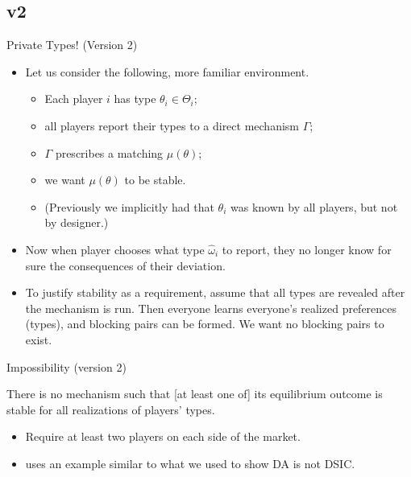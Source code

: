\documentclass[english,10pt
,aspectratio=169
]{beamer}
\begin{document}
\subsection{v2}

\begin{frame}{Private Types! (Version 2)}
\begin{itemize}
	\item Let us consider the following, more familiar environment.
	\begin{itemize}
		\item Each player $i$ has  type $\theta_i \in \Theta_i$;
		\item all players report their types to a direct mechanism $\Gamma$;
		\item $\Gamma$ prescribes a matching $\mu(\theta)$;
		\item we want $\mu(\theta)$ to be stable.
		\item (Previously we implicitly had that $\theta_i$ was known by all players, but not by designer.)
	\end{itemize}
	\item Now when player chooses what type $\hat{\omega}_i$ to report, they no longer know for sure the consequences of their deviation.
	\item To justify stability as a requirement, assume that all types are revealed after the mechanism is run. Then everyone learns everyone's realized preferences (types), and blocking pairs can be formed. We want no blocking pairs to exist.
\end{itemize}
\end{frame}


\begin{frame}{Impossibility (version 2)}
\begin{theorem}[Roth, RS Th.4.23]
	There is no mechanism such that [at least one of] its equilibrium outcome is stable for all realizations of players' types.
\end{theorem}
\begin{itemize}
	\item Require at least two players on each side of the market.
	\item {} uses an example similar to what we used to show DA is not DSIC.
\end{itemize}
\end{frame}
\end{document}
